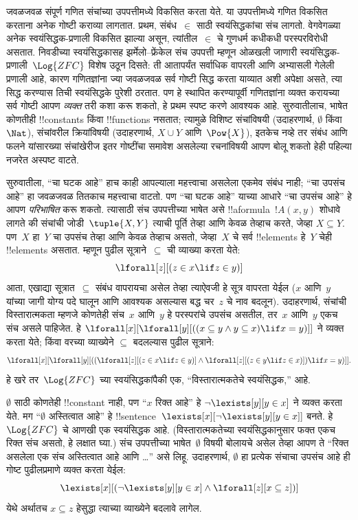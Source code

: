\documentclass[../../../include/open-logic-section]{subfiles}
\begin{document}


जवळजवळ संपूर्ण गणित संचांच्या उपपत्तीमध्ये विकसित करता येते. या
उपपत्तीमध्ये गणित विकसित करताना अनेक गोष्टी कराव्या लागतात. प्रथम,
संबंध~$\in$ साठी स्वयंसिद्धकांचा संच लागतो. वेगवेगळ्या अनेक
स्वयंसिद्धक-प्रणाली विकसित झाल्या असून, त्यांतील~$\in$ चे गुणधर्म कधीकधी
परस्परविरोधी असतात. निवडीच्या स्वयंसिद्धकासह झर्मेलो--फ्रेंकेल संच
उपपत्ती म्हणून ओळखली जाणारी स्वयंसिद्धक-प्रणाली~$\Log{ZFC}$ विशेष उठून
दिसते: ती आतापर्यंत सर्वाधिक वापरली आणि अभ्यासली गेलेली प्रणाली आहे, कारण
गणितज्ञांना ज्या जवळजवळ सर्व गोष्टी सिद्ध करता याव्यात अशी अपेक्षा असते,
त्या सिद्ध करण्यास तिची स्वयंसिद्धके पुरेशी ठरतात. पण हे स्थापित करण्यापूर्वी
गणितज्ञांना व्यक्त करायच्या सर्व गोष्टी आपण \emph{व्यक्त} तरी कशा करू शकतो,
हे प्रथम स्पष्ट करणे आवश्यक आहे. सुरुवातीलाच, भाषेत कोणतीही !!{constant}s
किंवा !!{function}s नसतात; त्यामुळे विशिष्ट संचांविषयी (उदाहरणार्थ,
$\emptyset$ किंवा~$\Nat$), संचांवरील क्रियांविषयी (उदाहरणार्थ,
$X \cup Y$ आणि~$\Pow{X}$), इतकेच नव्हे तर संबंध आणि फलने यांसारख्या
संचांखेरीज इतर गोष्टींचा समावेश असलेल्या रचनांविषयी आपण बोलू शकतो हेही
पहिल्या नजरेत अस्पष्ट वाटते.

सुरुवातीला, ``चा घटक आहे'' हाच काही आपल्याला महत्त्वाचा असलेला एकमेव संबंध
नाही; ``चा उपसंच आहे'' हा जवळजवळ तितकाच महत्त्वाचा वाटतो. पण ``चा घटक
आहे'' याच्या आधारे ``चा उपसंच आहे'' हे आपण \emph{परिभाषित} करू शकतो. त्यासाठी
संच उपपत्तीच्या भाषेत असे !!a{formula}~$!A(x, y)$ शोधावे लागते की संचांची
जोडी~$\tuple{X, Y}$ त्याची पूर्ति तेव्हा आणि केवळ तेव्हाच करते, जेव्हा
$X \subseteq Y$. पण~$X$ हा~$Y$ चा उपसंच तेव्हा आणि केवळ तेव्हाच असतो,
जेव्हा~$X$ चे सर्व !!{element}s हे~$Y$ चेही !!{element}s असतात. म्हणून
पुढील सूत्राने~$\subseteq$ ची व्याख्या करता येते:
\[
\lforall[z][(z \in x \lif z \in y)]
\]
आता, एखाद्या सूत्रात~$\subseteq$ संबंध वापरायचा असेल तेव्हा त्याऐवजी हे
सूत्र वापरता येईल ($x$ आणि~$y$ यांच्या जागी योग्य पदे घालून आणि आवश्यक
असल्यास बद्ध चर~$z$ चे नाव बदलून). उदाहरणार्थ, संचांची विस्तारात्मकता
म्हणजे कोणतेही संच~$x$ आणि~$y$ हे परस्परांचे उपसंच असतील, तर~$x$ आणि~$y$
एकच संच असले पाहिजेत. हे
$\lforall[x][\lforall[y][((x \subseteq y \land y
    \subseteq x) \lif x = y)]]$ ने व्यक्त करता येते; किंवा वरच्या व्याख्येने
$\subseteq$ बदलल्यास पुढील सूत्राने:
\[
\lforall[x][\lforall[y][((\lforall[z][(z \in x \lif z \in y)] \land
    \lforall[z][(z \in y \lif z \in x)]) \lif x = y)]].
\]
हे खरे तर~$\Log{ZFC}$ च्या स्वयंसिद्धकांपैकी एक, ``विस्तारात्मकतेचे
स्वयंसिद्धक,'' आहे.

$\emptyset$ साठी कोणतेही !!{constant} नाही, पण ``$x$ रिक्त आहे'' हे
$\lnot \lexists[y][y \in x]$ ने व्यक्त करता येते. मग ``$\emptyset$
अस्तित्वात आहे'' हे !!{sentence}~$\lexists[x][\lnot \lexists[y][y \in
    x]]$ बनते. हे~$\Log{ZFC}$ चे आणखी एक स्वयंसिद्धक आहे. (विस्तारात्मकतेच्या
स्वयंसिद्धकानुसार फक्त एकच रिक्त संच असतो, हे लक्षात घ्या.) संच उपपत्तीच्या
भाषेत~$\emptyset$ विषयी बोलायचे असेल तेव्हा आपण ते ``रिक्त असलेला एक संच
अस्तित्वात आहे आणि \dots'' असे लिहू. उदाहरणार्थ, $\emptyset$ हा प्रत्येक संचाचा
उपसंच आहे ही गोष्ट पुढीलप्रमाणे व्यक्त करता येईल:
\[
\lexists[x][(\lnot\lexists[y][y \in x] \land \lforall[z][x \subseteq
    z])]
\]
येथे अर्थातच $x \subseteq z$ हेसुद्धा त्याच्या व्याख्येने बदलावे लागेल.
\end{document}
